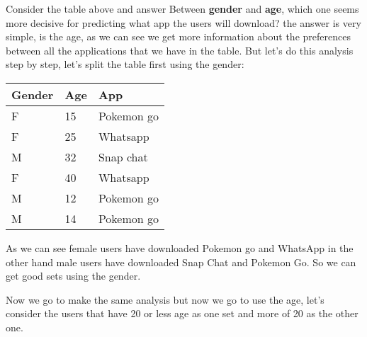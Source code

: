 Consider the table above and answer \textsf{Between \textbf{gender} and \textbf{age}, which one seems more decisive for predicting what app the users will download?} the answer is very simple, is the age, as we can see we get more information about the preferences between all the applications that we have in the table. But let's do this analysis step by step, let's split the table first using the gender:

\begin{longtable}[c]{lll}
    \rowcolor[HTML]{010066} 
    {\color[HTML]{FFFFFF} \textbf{Gender}} & {\color[HTML]{FFFFFF} \textbf{Age}} & {\color[HTML]{FFFFFF} \textbf{App}} \\
    \endfirsthead
    \endhead
    \rowcolor[HTML]{FFCCC9} 
    F                                      & 15                                  & {\color[HTML]{333333} Pokemon go}   \\
    \rowcolor[HTML]{FFCCC9} 
    F                                      & 25                                  & Whatsapp                            \\
    \rowcolor[HTML]{CBCEFB} 
    M                                      & 32                                  & Snap chat                           \\
    \rowcolor[HTML]{FFCCC9} 
    F                                      & 40                                  & Whatsapp                            \\
    \rowcolor[HTML]{CBCEFB} 
    M                                      & 12                                  & Pokemon go                          \\
    \rowcolor[HTML]{CBCEFB} 
    M                                      & 14                                  & Pokemon go                         
\end{longtable}

As we can see female users have downloaded Pokemon go and WhatsApp in the other hand male users have downloaded Snap Chat and Pokemon Go. So we can get good sets using the gender. \hfill \break

Now we go to make the same analysis but now we go to use the age, let's consider the users that have 20 or less age as one set and more of 20 as the other one.

